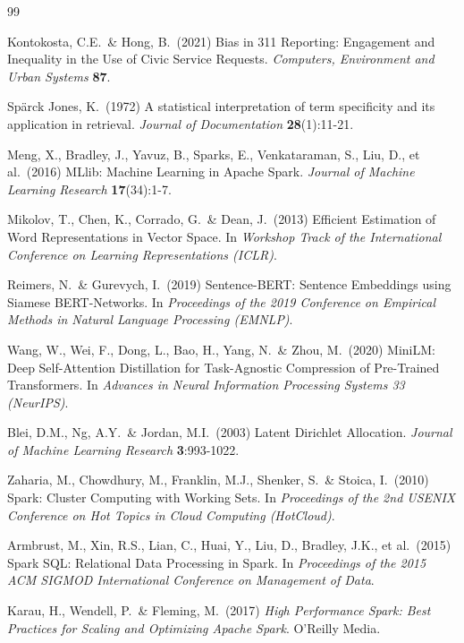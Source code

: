 \documentclass[11pt,letterpaper]{book}
\begin{document}
\begin{thebibliography}{99}

 Kontokosta, C.E.\ \& Hong, B.\ (2021) Bias in 311 Reporting: Engagement and Inequality in the Use of Civic Service Requests. \emph{Computers, Environment and Urban Systems} \textbf{87}.

 Sp\"arck Jones, K.\ (1972) A statistical interpretation of term specificity and its application in retrieval. \emph{Journal of Documentation} \textbf{28}(1):11-21.

 Meng, X., Bradley, J., Yavuz, B., Sparks, E., Venkataraman, S., Liu, D., et al.\ (2016) MLlib: Machine Learning in Apache Spark. \emph{Journal of Machine Learning Research} \textbf{17}(34):1-7.

 Mikolov, T., Chen, K., Corrado, G.\ \& Dean, J.\ (2013) Efficient Estimation of Word Representations in Vector Space. In \emph{Workshop Track of the International Conference on Learning Representations (ICLR)}.

 Reimers, N.\ \& Gurevych, I.\ (2019) Sentence-BERT: Sentence Embeddings using Siamese BERT-Networks. In \emph{Proceedings of the 2019 Conference on Empirical Methods in Natural Language Processing (EMNLP)}.

 Wang, W., Wei, F., Dong, L., Bao, H., Yang, N.\ \& Zhou, M.\ (2020) MiniLM: Deep Self-Attention Distillation for Task-Agnostic Compression of Pre-Trained Transformers. In \emph{Advances in Neural Information Processing Systems 33 (NeurIPS)}.

 Blei, D.M., Ng, A.Y.\ \& Jordan, M.I.\ (2003) Latent Dirichlet Allocation. \emph{Journal of Machine Learning Research} \textbf{3}:993-1022.

 Zaharia, M., Chowdhury, M., Franklin, M.J., Shenker, S.\ \& Stoica, I.\ (2010) Spark: Cluster Computing with Working Sets. In \emph{Proceedings of the 2nd USENIX Conference on Hot Topics in Cloud Computing (HotCloud)}.

 Armbrust, M., Xin, R.S., Lian, C., Huai, Y., Liu, D., Bradley, J.K., et al.\ (2015) Spark SQL: Relational Data Processing in Spark. In \emph{Proceedings of the 2015 ACM SIGMOD International Conference on Management of Data}.

 Karau, H., Wendell, P.\ \& Fleming, M.\ (2017) \emph{High Performance Spark: Best Practices for Scaling and Optimizing Apache Spark}. O'Reilly Media.


\end{thebibliography}
\end{document}
